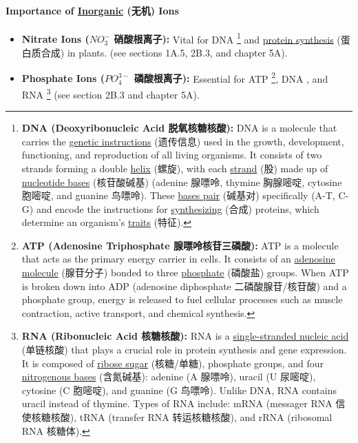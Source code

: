 \paragraph{Importance of \underline{Inorganic} (无机) Ions}
\begin{itemize}
    \item \textbf{Nitrate Ions ($NO_3^-$ 硝酸根离子):} Vital for DNA \footnote{\textbf{DNA (Deoxyribonucleic Acid 脱氧核糖核酸):} DNA
    is a molecule that carries the \underline{genetic instructions} (遗传信息) used in the growth, development, functioning, and
    reproduction of all living organisms. It consists of two strands forming a double \underline{helix} (螺旋), with each
    \underline{strand} (股) made up of \underline{nucleotide bases} (核苷酸碱基) (adenine 腺嘌呤, thymine 胸腺嘧啶, cytosine 胞嘧啶,
    and guanine 鸟嘌呤). These \underline{bases pair} (碱基对) specifically (A-T, C-G) and encode the instructions for
    \underline{synthesizing} (合成) proteins, which determine an organism's \underline{traits} (特征).} and \underline{protein
    synthesis} (蛋白质合成) in plants. (see sections 1A.5, 2B.3, and chapter 5A).
    \item \textbf{Phosphate Ions ($PO_4^{3-}$ 磷酸根离子):} Essential for ATP \footnote{\textbf{ATP (Adenosine Triphosphate
    腺嘌呤核苷三磷酸):} ATP is a molecule that acts as the primary energy carrier in cells. It consists of an \underline{adenosine
    molecule} (腺苷分子) bonded to three \underline{phosphate} (磷酸盐) groups. When ATP is broken down into ADP (adenosine
    diphosphate 二磷酸腺苷/核苷酸) and a phosphate group, energy is released to fuel cellular processes such as muscle contraction,
    active transport, and chemical synthesis.}, DNA \footnotemark[3], and RNA \footnote{\textbf{RNA (Ribonucleic Acid 核糖核酸):}
    RNA is a \underline{single-stranded nucleic acid} (单链核酸) that plays a crucial role in protein synthesis and gene
    expression. It is composed of \underline{ribose sugar} (核糖/单糖), phosphate groups, and four \underline{nitrogenous bases}
    (含氮碱基): adenine (A 腺嘌呤), uracil (U 尿嘧啶), cytosine (C 胞嘧啶), and guanine (G 鸟嘌呤). Unlike DNA, RNA contains uracil
    instead of thymine. Types of RNA include: mRNA \footnotemark[6] (messager RNA 信使核糖核酸), tRNA \footnotemark[7] (transfer
    RNA 转运核糖核酸), and rRNA \footnotemark[8] (ribosomal RNA 核糖体).} (see section 2B.3 and chapter 5A).
\end{itemize}
